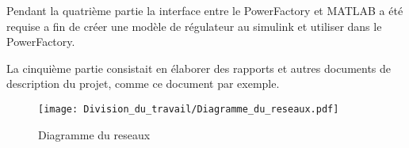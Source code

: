 	Pendant la quatrième partie la interface entre le PowerFactory et MATLAB a été requise a fin de créer une modèle de régulateur au simulink et utiliser dans le PowerFactory.
\pagebreak

La cinquième partie consistait en élaborer des rapports et autres documents de description du projet, comme ce document par exemple.

\begin{figure}[H]
	\begin{center}	
		\texttt{[image: Division\_du\_travail/Diagramme\_du\_reseaux.pdf]}
		\caption{Diagramme du reseaux}
		\label{fig:Diagramme_du_reseaux}
	\end{center}
\end{figure}
\newpage